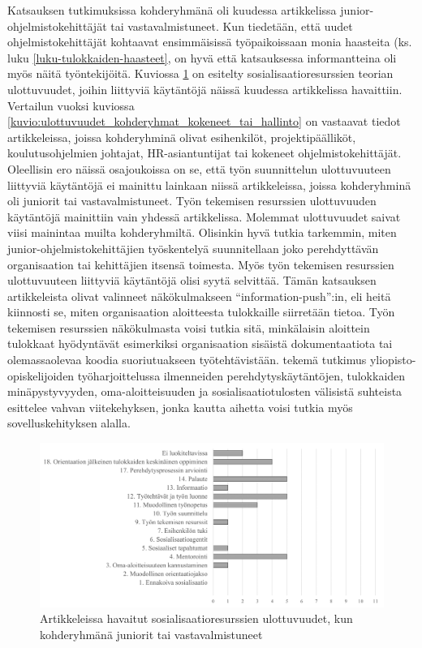 \documentclass[utf8]{gradu3}
\begin{document}
Katsauksen tutkimuksissa kohderyhmänä oli kuudessa artikkelissa junior-ohjelmistokehittäjät tai vastavalmistuneet. Kun tiedetään, että uudet ohjelmistokehittäjät kohtaavat ensimmäisissä työpaikoissaan monia haasteita (ks. luku \ref{luku-tulokkaiden-haasteet}, on hyvä että katsauksessa informantteina oli myös näitä työntekijöitä. Kuviossa \ref{kuvio:ulottuvuudet_kohderyhmat_juniorit} on esitelty sosialisaatioresurssien teorian ulottuvuudet, joihin liittyviä käytäntöjä näissä kuudessa artikkelissa havaittiin. Vertailun vuoksi kuviossa \ref{kuvio:ulottuvuudet_kohderyhmat_kokeneet_tai_hallinto} on vastaavat tiedot artikkeleissa, joissa kohderyhminä olivat esihenkilöt, projektipäälliköt, koulutusohjelmien johtajat, HR-asiantuntijat tai kokeneet ohjelmistokehittäjät. Oleellisin ero näissä osajoukoissa on se, että työn suunnittelun ulottuvuuteen liittyviä käytäntöjä ei mainittu lainkaan niissä artikkeleissa, joissa kohderyhminä oli juniorit tai vastavalmistuneet. Työn tekemisen resurssien ulottuvuuden käytäntöjä mainittiin vain yhdessä artikkelissa. Molemmat ulottuvuudet saivat viisi mainintaa muilta kohderyhmiltä. Olisinkin hyvä tutkia tarkemmin, miten junior-ohjelmistokehittäjien työskentelyä suunnitellaan joko perehdyttävän organisaation tai kehittäjien itsensä toimesta. Myös työn tekemisen resurssien ulottuvuuteen liittyviä käytäntöjä olisi syytä selvittää. Tämän katsauksen artikkeleista \textcite{yates-ym-2020} olivat valinneet näkökulmakseen ``information-push'':in, eli heitä kiinnosti se, miten organisaation aloitteesta tulokkaille siirretään tietoa. Työn tekemisen resurssien näkökulmasta voisi tutkia sitä, minkälaisin aloittein tulokkaat hyödyntävät esimerkiksi organisaation sisäistä dokumentaatiota tai olemassaolevaa koodia suoriutuakseen työtehtävistään. \textcite{gruman-ym-2006} tekemä tutkimus yliopisto-opiskelijoiden työharjoittelussa ilmenneiden perehdytyskäytäntöjen, tulokkaiden minäpystyvyyden, oma-aloitteisuuden ja sosialisaatiotulosten välisistä suhteista esittelee vahvan viitekehyksen, jonka kautta aihetta voisi tutkia myös sovelluskehityksen alalla.

\begin{figure}[h]
    \centering
    \includegraphics[width=\textwidth]{media/ulottuvuudet_kohderyhmat_juniorit-tai_vastavalmistuneet.png}
    \caption{Artikkeleissa havaitut sosialisaatioresurssien ulottuvuudet, kun kohderyhmänä juniorit tai vastavalmistuneet}
    \label{kuvio:ulottuvuudet_kohderyhmat_juniorit}
\end{figure}
\end{document}
